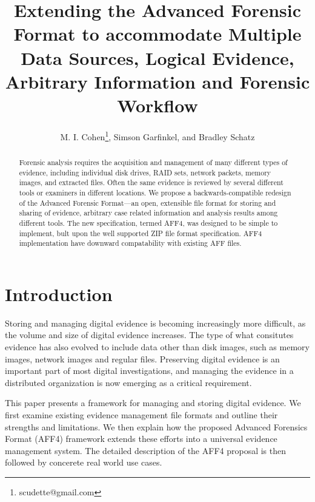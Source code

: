 \documentclass[10pt, conference]{IEEEtran}
\begin{document}
\title{Extending the Advanced Forensic Format to accommodate Multiple
  Data Sources, Logical Evidence, Arbitrary Information and Forensic Workflow}
\author{M. I. Cohen\footnote{scudette@gmail.com}, Simson Garfinkel, and Bradley Schatz}
\maketitle

\begin{abstract}
Forensic analysis requires the acquisition and management of many
different types of evidence, including individual disk drives, RAID
sets, network packets, memory images, and extracted files. Often the
same evidence is reviewed by several different tools or examiners in
different locations. We propose a backwards-compatible redesign of the
Advanced Forensic Format---an open, extensible file format for storing
and sharing of evidence, arbitrary case related information and
analysis results among different tools. The new specification, termed
AFF4, was designed to be simple to implement, bult upon the well
supported ZIP file format specification. AFF4 implementation have
downward compatability with existing AFF files.
\end{abstract}

\section{Introduction}
Storing and managing digital evidence is becoming increasingly more
difficult, as the volume and size of digital evidence increases. The
type of what consitutes evidence has also evolved to include data
other than disk images, such as memory images, network images and
regular files. Preserving digital evidence is an important part of
most digital investigations\cite{carrier:event-based}, and managing
the evidence in a distributed organization is now emerging as a
critical requirement.

This paper presents a framework for managing and storing digital
evidence. We first examine existing evidence management file formats
and outline their strengths and limitations. We then explain how the
proposed Advanced Forensics Format (AFF4) framework extends these
efforts into a universal evidence management system. The detailed
description of the AFF4 proposal is then followed by concerete real
world use cases.
\end{document}
